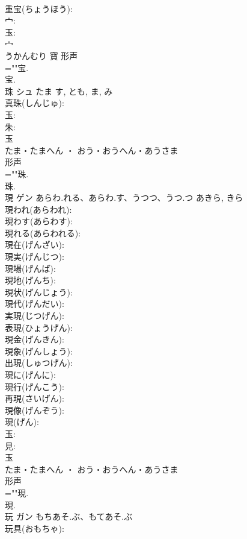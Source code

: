 \documentclass[8pt]{extreport}
\begin{document}
\begin{CJK}{UTF8}{min}
\\	重宝(ちょうほう): 
\\	宀: 
\\	玉: 
\\	宀	
\\	うかんむり	寶	形声 
\\	=""宝.
\\	宝.
\\	珠	シュ	たま	す, とも, ま, み	
\\	真珠(しんじゅ): 
\\	玉: 
\\	朱: 
\\	玉	
\\	たま・たまへん ・ おう・おうへん・あうさま	
\\	形声 
\\	=""珠.
\\	珠.
\\	現	ゲン	あらわ.れる、あらわ.す、うつつ、うつ.つ	あきら, きら	
\\	現われ(あらわれ): 
\\	現わす(あらわす): 
\\	現れる(あらわれる): 
\\	現在(げんざい): 
\\	現実(げんじつ): 
\\	現場(げんば): 
\\	現地(げんち): 
\\	現状(げんじょう): 
\\	現代(げんだい): 
\\	実現(じつげん): 
\\	表現(ひょうげん): 
\\	現金(げんきん): 
\\	現象(げんしょう): 
\\	出現(しゅつげん): 
\\	現に(げんに): 
\\	現行(げんこう): 
\\	再現(さいげん): 
\\	現像(げんぞう): 
\\	現(げん): 
\\	玉: 
\\	見: 
\\	玉	
\\	たま・たまへん ・ おう・おうへん・あうさま	
\\	形声 
\\	=""現.
\\	現.
\\	玩	ガン	もちあそ.ぶ、もてあそ.ぶ		
\\	玩具(おもちゃ): 

\end{CJK}
\end{document}
